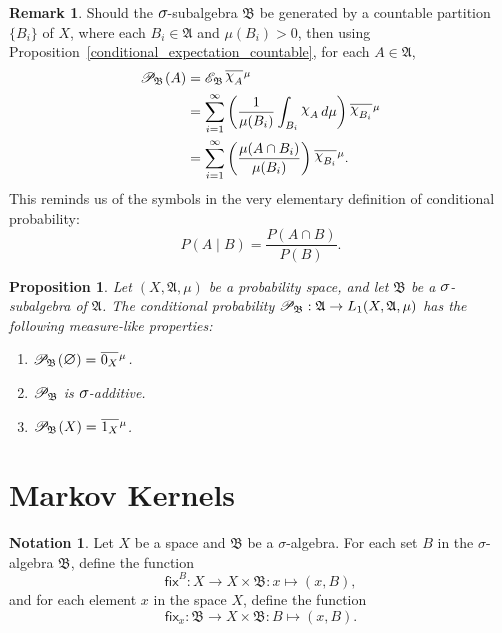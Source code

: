 \documentclass[
twoside=true,
paper=letter,
fontsize=11pt,
pagesize=auto,
leqno,
openany,
headsepline,
overfullrule,
]{scrbook}
\theoremstyle{plain}
\theoremstyle{plain}
\newtheorem{prop}[thm]{Proposition}
\theoremstyle{definition}
\newtheorem{rmk}[thm]{Remark}
\newtheorem{notn}[thm]{Notation}
\theoremstyle{bfnoteitalic}
\theoremstyle{bfnoteroman}
\newcommand{\sigalg}[1]{\mathfrak{#1}}
\newcommand{\cali}[1]{\mathscr{#1}}
\newcommand{\sfop}[1]{\mathsf{#1}}
\newcommand{\condexpsub}[2]
{\mathop{\cali{E}\hspace{-1.5pt}}\nolimits_{#2}\hspace{-1pt}#1}
\newcommand{\condprobsub}[2]
{\mathop{\cali{P}\hspace{-1.5pt}}\nolimits_{#2}\hspace{-1pt}\left(#1\right)}
\newcommand{\condprobop}[1]{\mathop{\cali{P}\hspace{-1pt}}\nolimits_{#1}}
\newcommand{\textsigma}{\hbox{\large{$\sigma$}}\kern-1pt}
\newcommand{\charfunction}[1]{{\raisebox{2pt}{$\chi$}}_{#1}}
\newcommand{\mtset}{\hbox{\large{$\varnothing$}}}
\newcommand{\meets}{\cap}
\newcommand{\sigmaalgebra}{\sigalg{A}}
\newcommand{\sigmaalgebraii}{\sigalg{B}}
\newcommand{\Lone}{L_1(\measurespace, \sigmaalgebra, \measure)}
\newcommand{\sigalgb}{\sigmaalgebraii}
\newcommand{\measurespace}{X}
\newcommand{\mspaceelt}{x}
\newcommand{\measure}{\mu}
\newcommand{\seti}{A}
\newcommand{\setii}{B}
\newcommand{\fixinthefirst}[1]{\sfop{fix}_{#1}}
\newcommand{\fixinthesecond}[1]{\sfop{fix}^{#1}}
\newcommand*\xbar[1]{%
   \hbox{%
     \vbox{%
       \hrule height 0.4pt %
       \kern0.4ex%
       \hbox{%
         \ensuremath{#1}%
       }%
     }%
   }%
}
\newcommand{\lebclass}[1]{\hspace{.5pt}\xbar{#1}\hspace{0.5pt}}
\newcommand{\ellclass}[2]{\lebclass{#1}^{#2}}
\begin{document}
\begin{rmk}
Should the $\textsigma$-subalgebra $\sigmaalgebraii$ be generated by a countable partition $\{\setii_i\}$ of $\measurespace$, where each $\setii_i\in\sigmaalgebra$ and $\measure(\setii_i)>0$, then using Proposition~\ref{conditional_expectation_countable}, for each 
$\seti\in\sigmaalgebra$,
\begin{align*}
\condprobsub{\seti}{\sigalgb}
& = \condexpsub{\ellclass{\charfunction{\seti}}{\measure}}{\sigmaalgebraii} \\
& =
\sum_{i=1}^{\infty}
\left(
\frac{1}{\measure(\setii_i)}
\int_{\setii_i} \charfunction{\seti}\, d\measure
\right)
\ellclass{\charfunction{\setii_i}}{\measure} \\
& = 
\sum_{i=1}^{\infty}
\left(
\frac{\measure(\seti \meets \setii_i)}{\measure(\setii_i)}
\right)
\ellclass{\charfunction{\setii_i}}{\measure}.
\end{align*}
This reminds us of the symbols in the very elementary definition of conditional probability: 
\[
P(A\mid B) = \frac{P(A\meets B)}{P(B)}.
\]
\end{rmk}



\begin{prop}
Let
$(\measurespace,\sigmaalgebra,\measure)$
be a probability space, and let $\sigmaalgebraii$ be a $\textsigma$-subalgebra of $\sigmaalgebra$.
The conditional probability $\condprobop{\sigmaalgebraii}: \sigmaalgebra \to \Lone$  
has the following measure-like properties:
\begin{enumerate}
\item 
$\condprobsub{\mtset}{\sigmaalgebraii} = \ellclass{0_\measurespace}{\measure}$.
\item
$\condprobop{\sigmaalgebraii}$ is $\textsigma$-additive.
\item
$\condprobsub{\measurespace}{\sigmaalgebraii} = \ellclass{1_\measurespace}{\measure}$.
\end{enumerate}
\end{prop}




\section{Markov Kernels}
\begin{notn}
Let 
$\measurespace$ be a space and 
$\sigmaalgebraii$ be a \textsigma-algebra.
For each set $\setii$ in the \textsigma-algebra $\sigmaalgebraii$, define the function
\[
\fixinthesecond{\setii}
: \measurespace\to\measurespace\times\sigmaalgebraii
: \mspaceelt\mapsto(\mspaceelt,\setii),
\]
 and for each  element $\mspaceelt$ in the space $\measurespace$, define the function
\[
\fixinthefirst{\mspaceelt}
: \sigmaalgebraii\to\measurespace\times\sigmaalgebraii
: \setii\mapsto(\mspaceelt,\setii).
\]
\end{notn}
\end{document}
